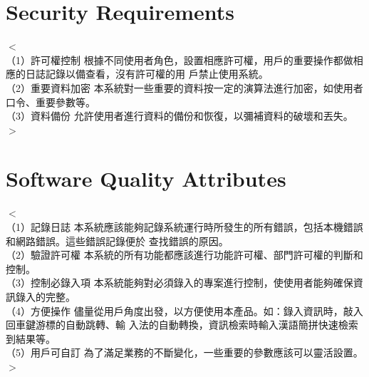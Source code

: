 \documentclass{scrreprt}
\begin{document}
\begin{CJK}{UTF8}{bkai}
\section{Security Requirements}
$<$\\（1）許可權控制 根據不同使用者角色，設置相應許可權，用戶的重要操作都做相應的日誌記錄以備查看，沒有許可權的用 戶禁止使用系統。 \\
（2）重要資料加密 本系統對一些重要的資料按一定的演算法進行加密，如使用者口令、重要參數等。\\
（3）資料備份 允許使用者進行資料的備份和恢復，以彌補資料的破壞和丟失。\\$>$

\section{Software Quality Attributes}
$<$\\（1）記錄日誌 本系統應該能夠記錄系統運行時所發生的所有錯誤，包括本機錯誤和網路錯誤。這些錯誤記錄便於 查找錯誤的原因。 \\
（2）驗證許可權 本系統的所有功能都應該進行功能許可權、部門許可權的判斷和控制。 \\
（3）控制必錄入項
本系統能夠對必須錄入的專案進行控制，使使用者能夠確保資訊錄入的完整。 \\
（4）方便操作 儘量從用戶角度出發，以方便使用本產品。如：錄入資訊時，敲入回車鍵游標的自動跳轉、輸 入法的自動轉換，資訊檢索時輸入漢語簡拼快速檢索到結果等。 \\
（5）用戶可自訂 為了滿足業務的不斷變化，一些重要的參數應該可以靈活設置。\\
$>$


\end{CJK}
\end{document}
